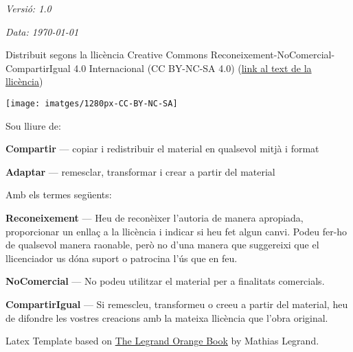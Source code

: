 \noindent \textit{Versió: 1.0} %

\noindent \textit{Data: \today}
\par

\begin{mdframed}[outerlinecolor=black,outerlinewidth=2pt,linecolor=cccolor,middlelinewidth=3pt,roundcorner=10pt]
  Distribuit segons la llicència Creative Commons Reconeixement-NoComercial-CompartirIgual 4.0 Internacional (CC BY-NC-SA 4.0) (\href{https://creativecommons.org/licenses/by-nc-sa/4.0/legalcode}{link al text de la llicència})
  \begin{center}
    \texttt{[image: imatges/1280px-CC-BY-NC-SA]}
  \end{center}
\end{mdframed}

\noindent Sou lliure de:
\begin{description}[leftmargin=\parindent]
 \item {\bf Compartir} — copiar i redistribuir el material en qualsevol mitjà i format
 \item {\bf Adaptar} — remesclar, transformar i crear a partir del material
\end{description}

\noindent Amb els termes següents:
\begin{description}[leftmargin=\parindent]
 \item {\bf Reconeixement} — Heu de reconèixer l'autoria de manera apropiada, proporcionar un enllaç a la llicència i indicar si heu fet algun canvi. Podeu fer-ho de qualsevol manera raonable, però no d'una manera que suggereixi que el llicenciador us dóna suport o patrocina l'ús que en feu.
 \item {\bf NoComercial} — No podeu utilitzar el material per a finalitats comercials.
 \item {\bf CompartirIgual} — Si remescleu, transformeu o creeu a partir del material, heu de difondre les vostres creacions amb la mateixa llicència que l'obra original.
\end{description}

\noindent Latex Template based on \href{https://www.latextemplates.com/template/the-legrand-orange-book}{The Legrand Orange Book} by Mathias Legrand.


